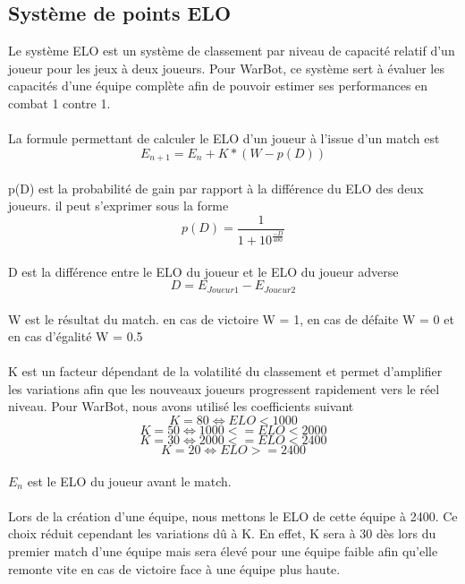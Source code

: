 \documentclass{report}
\begin{document}
\subsection{Système de points ELO}

Le système ELO est un système de classement par niveau de capacité relatif d'un joueur pour les jeux à deux joueurs. Pour WarBot, ce système sert à évaluer les capacités d'une équipe complète afin de pouvoir estimer ses performances en combat 1 contre 1. 
\paragraph{}
La formule permettant de calculer le ELO d'un joueur à l'issue d'un match est 
\[
E_{n+1} = E_n + K * (W - p(D))
\]
\paragraph{}
p(D) est la probabilité de gain par rapport à la différence du ELO des deux joueurs. il peut s'exprimer sous la forme
\[ 
p(D) = \frac{1}{1 + 10^{\frac{-D}{400}}}
\]
\paragraph{}
D est la différence entre le ELO du joueur et le ELO du joueur adverse
\[
D = E_{Joueur 1} - E_{Joueur 2}
\]
\paragraph{}
W est le résultat du match. en cas de victoire W = 1, en cas de défaite W = 0 et en cas d'égalité W = 0.5
\paragraph{}
K est un facteur dépendant de la volatilité du classement et permet d'amplifier les variations afin que les nouveaux joueurs progressent rapidement vers le réel niveau. Pour WarBot, nous avons utilisé les coefficients suivant
\[
K = 80 \iff ELO < 1000 
\]
\[
K = 50 \iff 1000 <= ELO < 2000
\]
\[
K = 30 \iff 2000 <= ELO < 2400
\]
\[
K = 20 \iff ELO >= 2400
\]
\paragraph{}
$E_n$ est le ELO du joueur avant le match.
\paragraph{}
Lors de la création d'une équipe, nous mettons le ELO de cette équipe à 2400. Ce choix réduit cependant les variations dû à K. En effet, K sera à 30 dès lors du premier match d'une équipe mais sera élevé pour une équipe faible afin qu'elle remonte vite en cas de victoire face à une équipe plus haute.
\end{document}
